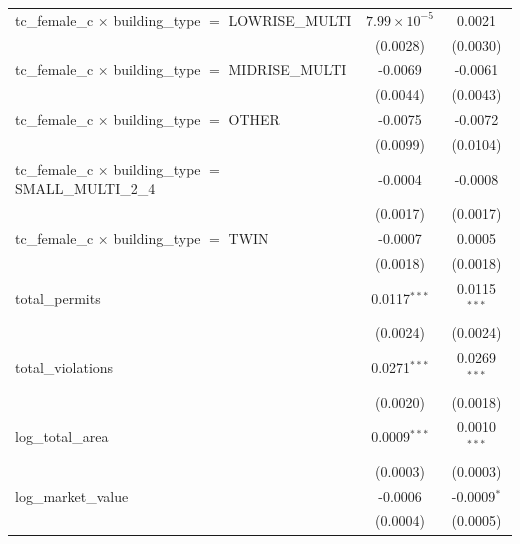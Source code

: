 \begin{tabular}{lcc}
   tc\_female\_c $\times$ building\_type $=$ LOWRISE\_MULTI            & $7.99\times 10^{-5}$  & 0.0021\\   
                                                                       & (0.0028)              & (0.0030)\\   
   tc\_female\_c $\times$ building\_type $=$ MIDRISE\_MULTI            & -0.0069               & -0.0061\\   
                                                                       & (0.0044)              & (0.0043)\\   
   tc\_female\_c $\times$ building\_type $=$ OTHER                     & -0.0075               & -0.0072\\   
                                                                       & (0.0099)              & (0.0104)\\   
   tc\_female\_c $\times$ building\_type $=$ SMALL\_MULTI\_2\_4        & -0.0004               & -0.0008\\   
                                                                       & (0.0017)              & (0.0017)\\   
   tc\_female\_c $\times$ building\_type $=$ TWIN                      & -0.0007               & 0.0005\\   
                                                                       & (0.0018)              & (0.0018)\\   
   total\_permits                                                      & 0.0117$^{***}$        & 0.0115$^{***}$\\   
                                                                       & (0.0024)              & (0.0024)\\   
   total\_violations                                                   & 0.0271$^{***}$        & 0.0269$^{***}$\\   
                                                                       & (0.0020)              & (0.0018)\\   
   log\_total\_area                                                    & 0.0009$^{***}$        & 0.0010$^{***}$\\   
                                                                       & (0.0003)              & (0.0003)\\   
   log\_market\_value                                                  & -0.0006               & -0.0009$^{*}$\\   
                                                                       & (0.0004)              & (0.0005)\\   

\end{tabular}

